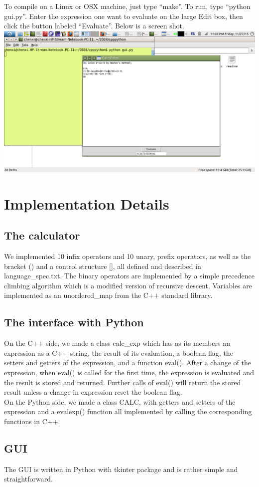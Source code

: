 \documentclass[]{article}
\begin{document}
To compile on a Linux or OSX machine, just type ``make''. To run, type ``python gui.py''. Enter the expression one want to evaluate on the large Edit box, then click the button labeled ``Evaluate''. Below is a screen shot.\\

\includegraphics[scale=0.25]{screenshot.png}

\section{Implementation Details}
\subsection{The calculator}
We implemented 10 infix operators and 10 unary, prefix operators, as well as the bracket () and a control structure [], all defined and described in language\_spec.txt. The binary operators are implemented by a simple precedence climbing algorithm which is a modified version of recursive descent. Variables are implemented as an unordered\_map from the C++ standard library.

\subsection{The interface with Python}
On the C++ side, we made a class calc\_exp which has as its members an expression as a C++ string, the result of its evaluation, a boolean flag, the setters and getters of the expression, and a function eval(). After a change of the expression, when eval() is called for the first time, the expression is evaluated and the result is stored and returned. Further calls of eval() will return the stored result unless a change in expression reset the boolean flag.\\

On the Python side, we made a class CALC, with getters and setters of the expression and a evalexp() function all implemented by calling the corresponding functions in C++.

\subsection{GUI}
The GUI is written in Python with tkinter package and is rather simple and straightforward.
\end{document}
